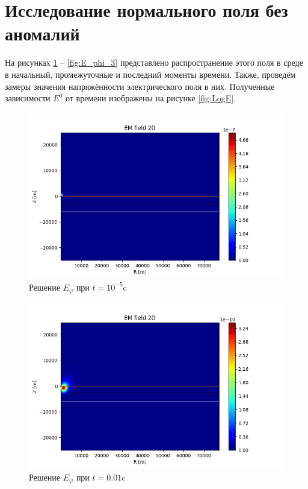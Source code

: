 \section{Исследование нормального поля без аномалий}

На рисунках \ref{fig:E_phi_0} -- \ref{fig:E_phi_3} представлено распространение этого поля в среде в начальный, промежуточные и последний моменты времени. Также, проведём замеры значения напряжённости электрического поля в них. Полученные зависимости $E^0$ от времени изображены на рисунке \ref{fig:LogE}.

\begin{figure}
	\centering
	\vspace*{0.7cm}
	\includegraphics[width=0.95\linewidth]{images/Answer_E_time_layer_1.png}
	\caption{Решение $E_{\varphi}$ при $t = 10^{-5}$c}
	\label{fig:E_phi_0}
\end{figure}

\begin{figure}
	\centering
	\vspace*{0.7cm}
	\includegraphics[width=0.95\linewidth]{images/Answer_E_time_layer_15.png}
	\caption{Решение $E_{\varphi}$ при $t = 0.01$c}
	\label{fig:E_phi_1}
\end{figure} 

